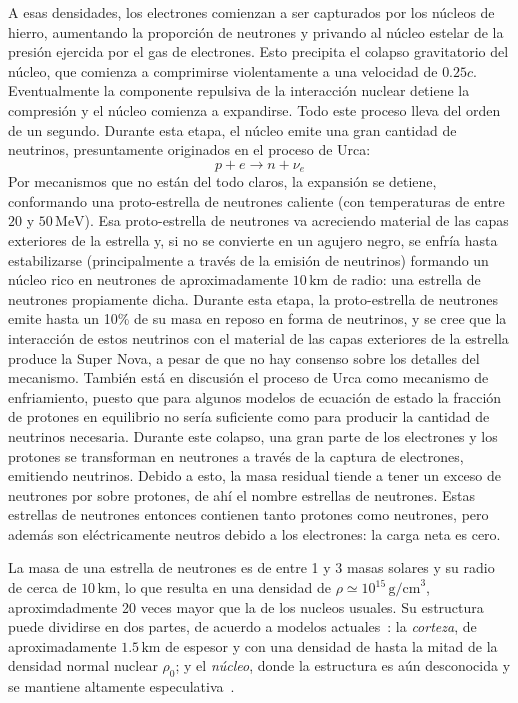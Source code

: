  A esas densidades, los electrones comienzan a ser capturados por los núcleos de hierro, aumentando la proporción de neutrones y privando al núcleo estelar de la presión ejercida por el gas de electrones.
Esto precipita el colapso gravitatorio del núcleo, que comienza a comprimirse violentamente a una velocidad de $0.25c$.
Eventualmente la componente repulsiva de la interacción nuclear detiene la compresión y el núcleo comienza a expandirse.
Todo este proceso lleva del orden de un segundo.
Durante esta etapa, el núcleo emite una gran cantidad de neutrinos, presuntamente originados en el proceso de Urca:
\begin{equation}
  p + e\rightarrow n + \nu_e
\end{equation}
 Por mecanismos que no están del todo claros, la expansión se detiene, conformando una proto-estrella de neutrones caliente (con temperaturas de entre $20$ y $50\,\text{MeV}$).
Esa proto-estrella de neutrones va acreciendo material de las capas exteriores de la estrella y, si no se convierte en un agujero negro, se enfría hasta estabilizarse (principalmente a través de la emisión de neutrinos) formando un núcleo rico en neutrones de aproximadamente $10\,\text{km}$ de radio: una estrella de neutrones propiamente dicha.
Durante esta etapa, la proto-estrella de neutrones emite hasta un 10\% de su masa en reposo en forma de neutrinos, y se cree que la interacción de estos neutrinos con el material de las capas exteriores de la estrella produce la Super Nova, a pesar de que no hay consenso sobre los detalles del mecanismo.
También está en discusión el proceso de Urca como mecanismo de enfriamiento, puesto que para algunos modelos de ecuación de estado la fracción de protones en equilibrio no sería suficiente como para producir la cantidad de neutrinos necesaria.
Durante este colapso, una gran parte de los electrones y los protones se transforman en neutrones a través de la captura de electrones, emitiendo neutrinos.
Debido a esto, la masa residual tiende a tener un exceso de neutrones por sobre protones, de ahí el nombre estrellas de neutrones.
Estas estrellas de neutrones entonces contienen tanto protones como neutrones, pero además son eléctricamente neutros debido a los electrones: la carga neta es cero.

La masa de una estrella de neutrones es de entre 1 y 3 masas solares y su radio de cerca de $10\,\text{km}$, lo que resulta en una densidad de $\rho \simeq 10^{15}\,\text{g/cm}^3$, aproximdadmente 20 veces mayor que la de los nucleos usuales.
Su estructura puede dividirse en dos partes, de acuerdo a modelos actuales~\cite{page_minimal_2004, geppert_temperature_2004}: la \emph{corteza}, de aproximadamente $1.5\,\text{km}$ de espesor y con una densidad de hasta la mitad de la densidad normal nuclear $\rho_0$; y el \emph{núcleo}, donde la estructura es aún desconocida y se mantiene altamente especulativa~\cite{woosley_physics_2005}.

